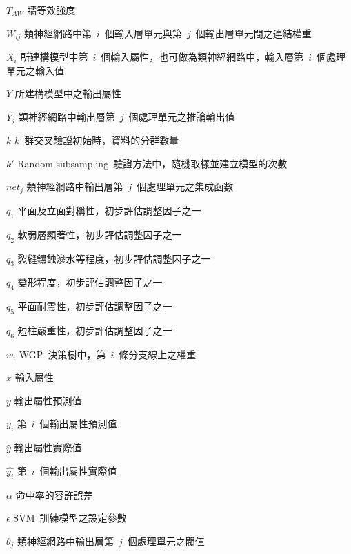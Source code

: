 \begin{SymEntry}
\item[$T_{AW}$]
牆等效強度

\item[$W_{ij}$]
類神經網路中第~$i$~個輸入層單元與第~$j$~個輸出層單元間之連結權重

\item[$X_i$]
所建構模型中第~$i$~個輸入屬性，也可做為類神經網路中，輸入層第~$i$~個處理單元之輸入值

\item[$Y$]
所建構模型中之輸出屬性

\item[$Y_j$]
類神經網路中輸出層第~$j$~個處理單元之推論輸出值

\item[$k$]
$k$~群交叉驗證初始時，資料的分群數量

\item[$k'$]
Random subsampling~驗證方法中，隨機取樣並建立模型的次數

\item[$net_j$]
類神經網路中輸出層第~$j$~個處理單元之集成函數

\item[$q_1$]
平面及立面對稱性，初步評估調整因子之一

\item[$q_2$]
軟弱層顯著性，初步評估調整因子之一

\item[$q_3$]
裂縫鏽蝕滲水等程度，初步評估調整因子之一

\item[$q_4$]
變形程度，初步評估調整因子之一

\item[$q_5$]
平面耐震性，初步評估調整因子之一

\item[$q_6$]
短柱嚴重性，初步評估調整因子之一

\item[$w_i$]
WGP~決策樹中，第~$i$~條分支線上之權重

\item[$x$]
輸入屬性

\item[$y$]
輸出屬性預測值

\item[$y_i$]
第~$i$~個輸出屬性預測值

\item[$\hat{y}$]
輸出屬性實際值

\item[$\hat{y_i}$]
第~$i$~個輸出屬性實際值


\item[$\alpha$]
命中率的容許誤差

\item[$\epsilon$]
SVM~訓練模型之設定參數

\item[$\theta_j$]
類神經網路中輸出層第~$j$~個處理單元之閥值



\end{SymEntry}